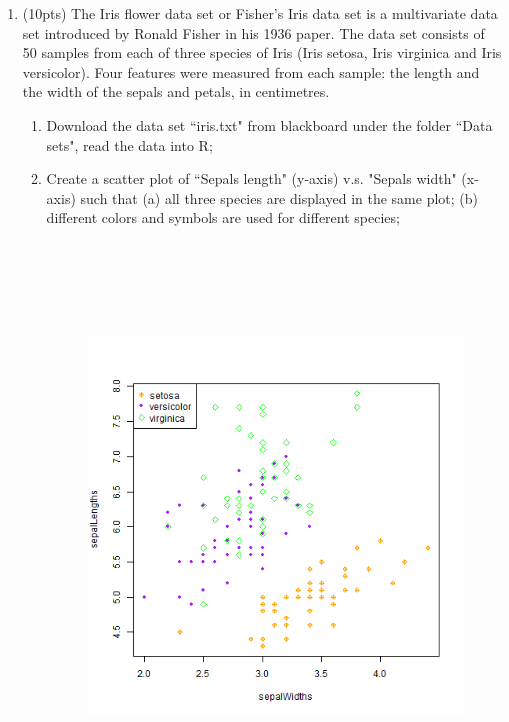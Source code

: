 \documentclass[11pt]{article}
\newcommand{\wh}{\widehat}
\begin{document}
\begin{enumerate}
\begin{enumerate}
{\begin{proof}
\[				\]
				\[
				\beta_1(\beta_0 + \beta_1\overline x) - \overline xE[\wh\beta_1^2] = \beta_1(\beta_0 + \beta_1\overline x) - \overline x(\frac{\sigma^2}{S_{xx}} + \beta_1^2)
				\]
				\[
				\beta_1\beta_0 + \beta_1^2\overline x - \overline x\frac{\sigma^2}{S_{xx}} + \overline x\beta_1^2 - \beta_0\beta_1 = - \overline x\frac{\sigma^2}{S_{xx}} = -\sigma^2\frac{\overline x}{S_{xx}}
				\]
			\end{proof}
		}
	\end{enumerate}
\item (10pts) The Iris flower data set or Fisher's Iris data set is a multivariate data set introduced by Ronald Fisher in his 1936 paper. The data set consists of 50 samples from each of three species of Iris (Iris setosa, Iris virginica and Iris versicolor). Four features were measured from each sample: the length and the width of the sepals and petals, in centimetres.
\begin{enumerate}
\item Download the data set ``iris.txt" from blackboard under the folder ``Data sets", read the data into R;
\item Create a scatter plot of ``Sepals length" (y-axis) v.s. "Sepals width" (x-axis) such that (a) all three species are displayed in the same plot; (b) different colors and symbols are used for different species;\\
\begin{figure}[H]
	\centering
	\includegraphics[width=15cm,height=15cm]{iris.png}

\end{figure}
\end{enumerate}
\end{enumerate}
\end{document}
